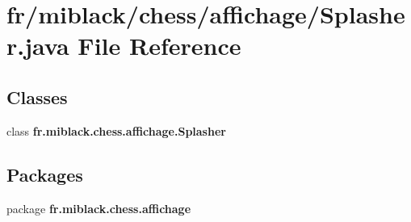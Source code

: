 \section{fr/miblack/chess/affichage/\-Splasher.java File Reference}
\label{Splasher_8java}
\subsection*{Classes}
\begin{DoxyCompactItemize}
\item 
class {\bf fr.\-miblack.\-chess.\-affichage.\-Splasher}
\end{DoxyCompactItemize}
\subsection*{Packages}
\begin{DoxyCompactItemize}
\item 
package {\bf fr.\-miblack.\-chess.\-affichage}
\end{DoxyCompactItemize}
